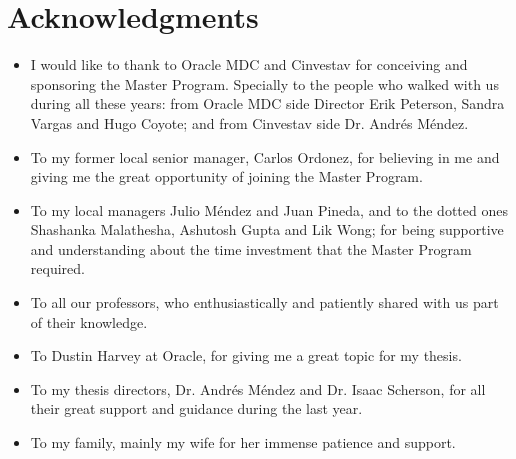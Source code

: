 \chapter*{Acknowledgments}

\begin{itemize}
  
\item I would like to thank to Oracle MDC and Cinvestav for conceiving
  and sponsoring the Master Program. Specially to the people who
  walked with us during all these years: from Oracle MDC side 
  Director Erik Peterson, Sandra Vargas and Hugo Coyote; and from Cinvestav
  side Dr. Andrés Méndez. \\

\item To my former local senior manager, Carlos Ordonez, for believing in me
  and giving me the great opportunity of joining the Master
  Program. \\

\item To my local managers Julio Méndez and Juan
  Pineda, and to the dotted ones Shashanka Malathesha, Ashutosh Gupta
  and Lik Wong; for being supportive and understanding about the time
  investment that the Master Program required. \\

\item To all our professors, who enthusiastically and patiently shared
  with us part of their knowledge. \\

\item To Dustin Harvey at Oracle, for giving me a great topic for my
  thesis. \\

\item To my thesis directors, Dr. Andrés Méndez and Dr. Isaac
  Scherson, for all their great support and guidance during the last year. \\ 

\item To my family, mainly my wife for her immense patience and
  support.

\end{itemize}




